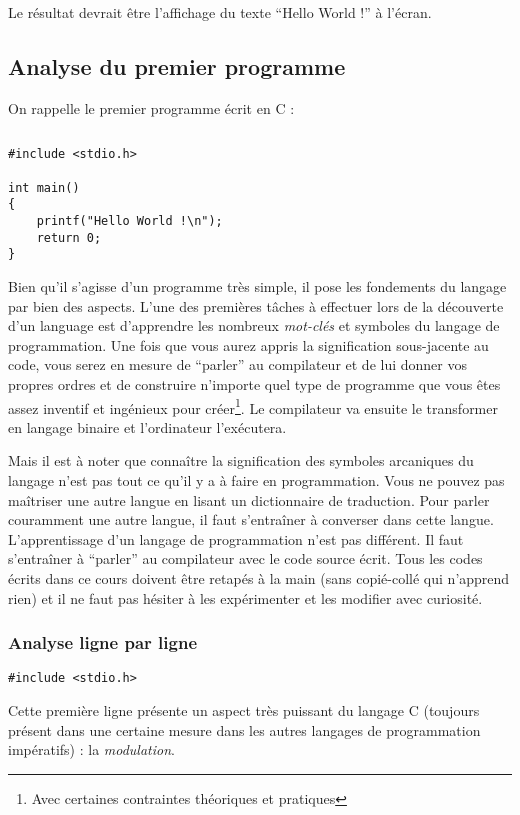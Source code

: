 \documentclass[../../main.tex]{subfiles}
\begin{document}
Le résultat devrait être l'affichage du texte ``Hello World !'' à l'écran.
\subsection{Analyse du premier programme}
On rappelle le premier programme écrit en C :
\begin{lstlisting}[title=Un premier programme]
\end{lstlisting}
\begin{verbatim}
#include <stdio.h>

int main()
{
	printf("Hello World !\n");
	return 0;
}
\end{verbatim}
Bien qu'il s'agisse d'un programme très simple, il pose les fondements du langage par bien des aspects. L'une des premières tâches à effectuer lors de la découverte d'un language est d'apprendre les nombreux \textit{mot-clés} et symboles du langage de programmation. Une fois que vous aurez appris la signification sous-jacente au code, vous serez en mesure de ``parler'' au compilateur et de lui donner vos propres ordres et de construire n'importe quel type de programme que vous êtes assez inventif et ingénieux pour créer\footnote{Avec certaines contraintes théoriques et pratiques}. Le compilateur va ensuite le transformer en langage binaire et l'ordinateur l'exécutera.

Mais il est à noter que connaître la signification des symboles arcaniques du langage n'est pas tout ce qu'il y a à faire en programmation. Vous ne pouvez pas maîtriser une autre langue en lisant un dictionnaire de traduction. Pour parler couramment une autre langue, il faut s'entraîner à converser dans cette langue. L'apprentissage d'un langage de programmation n'est pas différent. Il faut s'entraîner à ``parler'' au compilateur avec le code source écrit. Tous les codes écrits dans ce cours doivent être retapés à la main (sans copié-collé qui n'apprend rien) et il ne faut pas hésiter à les expérimenter et les modifier avec curiosité.

\subsubsection{Analyse ligne par ligne}
\begin{verbatim}
#include <stdio.h>
\end{verbatim}
Cette première ligne présente un aspect très puissant du langage C (toujours présent dans une certaine mesure dans les autres langages de programmation impératifs) : la \textit{modulation}.
\end{document}

